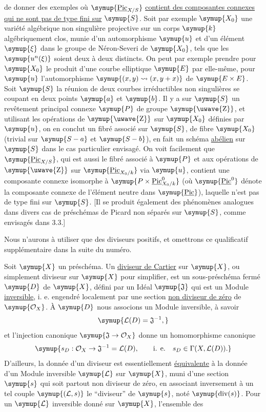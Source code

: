 de donner des exemples où $\symup{\underline{\operatorname{Pic}}_{X/S}}$ \uline{contient des composantes
connexes qui ne sont pas de type fini sur} $\symup{S}$. Soit par exemple $\symup{X_0}$ une
variété algébrique non singulière projective sur un corps $\symup{k}$ algébriquement
clos, munie d'un automorphisme $\symup{u}$ et d'un élément $\symup{\xi}$ dans le groupe de
Néron-Severi de $\symup{X_0}$, tels que les $\symup{u^n(\xi)}$ soient deux à deux distincts.
On peut par exemple prendre pour $\symup{X_0}$ le produit d'une courbe elliptique $\symup{E}$
par elle-même, pour $\symup{u}$ l'automorphisme
$\symup{(x,y)\rightsquigarrow(x,y+x)}$ de $\symup{E\times E}$. Soit $\symup{S}$ la réunion de deux courbes irréductibles non
singulières se coupant en deux points $\symup{a}$ et $\symup{b}$. Il y a sur $\symup{S}$ un revêtement
principal connexe $\symup{P}$ de groupe $\symup{\text{\uwave{Z}}}$, et utilisant les opérations de
$\symup{\text{\uwave{Z}}}$ sur $\symup{X_0}$ définies par $\symup{u}$, on en conclut un fibré associé sur $\symup{S}$,
de fibre $\symup{X_0}$ (trivial sur $\symup{S-a}$ et $\symup{S-b}$), en fait un schéma \uline{abélien} sur $\symup{S}$
dans le cas particulier envisagé. On voit facilement que
$\symup{\underline{\operatorname{Pic}}_{X/S}}$, qui est aussi le fibré associé à $\symup{P}$ et aux
opérations de $\symup{\text{\uwave{Z}}}$ sur $\symup{\underline{\operatorname{Pic}}_{X_0/k}}$ via $\symup{u}$, contient
une composante connexe isomorphe à
$\symup{P\times\underline{\operatorname{Pic}}^{0}_{X_0/k}}$ (où $\symup{\underline{\operatorname{Pic}}^{0}}$ dénote la composante connexe de l'élément neutre
dans $\symup{\underline{\operatorname{Pic}}}$), laquelle n'est pas de type fini sur $\symup{S}$. [Il se
produit également des phénomènes analogues dans divers cas de préschémas de
Picard non séparés sur $\symup{S}$, comme envisagés dans 3.3.]


Nous n'aurons à utiliser que des diviseurs positifs, et omettrons ce
qualificatif supplémentaire dans la suite du numéro.

Soit $\symup{X}$ un préschéma. Un \uline{diviseur de Cartier} sur $\symup{X}$, ou simplement
diviseur sur $\symup{X}$ pour simplifier, est un sous-préschéma fermé $\symup{D}$ de $\symup{X}$, défini
par un Idéal $\symup{\mathfrak J}$ qui est un Module \uline{inversible}, i. e. engendré localement
par une section \uline{non diviseur de zéro} de $\symup{\mathcal O_X}$. À $\symup{D}$ nous associons un
Module inversible, à savoir
\[
\symup{\mathcal L(D)=\mathfrak J^{-1},}
\]
et l'injection canonique $\symup{\mathfrak J\to\mathcal O_X}$ donne un
homomorphisme canonique
\[
\symup{s_D:\mathcal O_X\to\mathfrak J^{-1}=\mathcal L(D),
\qquad\text{i. e.}\quad s_D\in\Gamma(X,\mathcal L(D)).}
\]
D'ailleurs, la donnée d'un diviseur est essentiellement \uline{équivalente} à la
donnée d'un Module inversible $\symup{\mathcal L}$ sur $\symup{X}$, muni d'une section $\symup{s}$ qui
soit partout non diviseur de zéro, en associant inversement à un tel couple
$\symup{(\mathcal L,s)}$ le ``diviseur'' de $\symup{s}$, noté $\symup{\operatorname{div}(s)}$. Pour un
$\symup{\mathcal L}$ inversible donné sur $\symup{X}$, l'ensemble des

